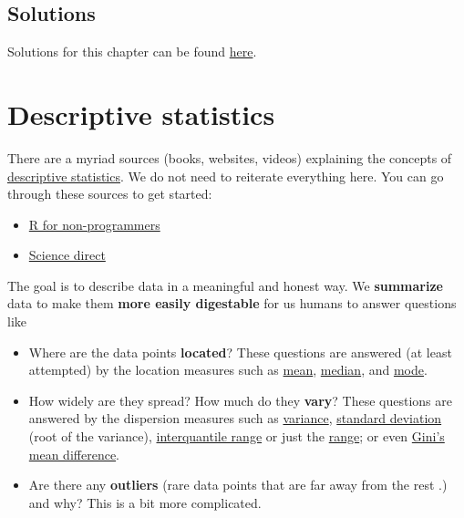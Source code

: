 \documentclass[
]{book}
\providecommand{\tightlist}{%
  \setlength{\itemsep}{0pt}\setlength{\parskip}{0pt}}
\begin{document}
\section{Solutions}\label{solutions}

Solutions for this chapter can be found \href{https://github.com/jdegenfellner/Script_QM1_ZHAW/tree/main/Solutions_to_Exercises/2_Probability}{here}.

\chapter{Descriptive statistics}\label{descriptive-statistics}

There are a myriad sources (books, websites, videos) explaining the concepts of \href{https://en.wikipedia.org/wiki/Descriptive_statistics}{descriptive statistics}.
We do not need to reiterate everything here. You can go through these sources to get started:

\begin{itemize}
\tightlist
\item
  \href{https://bookdown.org/daniel_dauber_io/r4np_book/descriptive-statistics.html}{R for non-programmers}
\item
  \href{https://www.sciencedirect.com/topics/social-sciences/descriptive-statistics}{Science direct}
\end{itemize}

The goal is to describe data in a meaningful and honest way.
We \textbf{summarize} data to make them \textbf{more easily digestable} for us humans to answer questions like

\begin{itemize}
\tightlist
\item
  Where are the data points \textbf{located}?
  These questions are answered (at least attempted) by the location measures such as
  \href{https://en.wikipedia.org/wiki/Mean}{mean}, \href{https://en.wikipedia.org/wiki/Median}{median}, and \href{https://en.wikipedia.org/wiki/Mode_(statistics)}{mode}.
\item
  How widely are they spread? How much do they \textbf{vary}?
  These questions are answered by the dispersion measures such as \href{https://en.wikipedia.org/wiki/Variance}{variance},
  \href{https://en.wikipedia.org/wiki/Standard_deviation}{standard deviation} (root of the variance),
  \href{https://en.wikipedia.org/wiki/Interquartile_range\#:~:text=The\%20IQR\%20of\%20a\%20set,a\%20median\%20calculated\%20as\%20follows.&text=The\%20second\%20quartile\%20Q2\%20is\%20the\%20same\%20as\%20the\%20ordinary\%20median.}{interquantile range}
  or just the \href{https://en.wikipedia.org/wiki/Range_(statistics)}{range}; or even \href{https://www.dss.uniroma1.it/RePec/mtn/articoli/2003-2-8.pdf}{Gini's mean difference}.
\item
  Are there any \textbf{outliers} (rare data points that are far away from the rest \citep[405]{westfall2020}.) and why?
  This is a bit more complicated.
\end{itemize}
\end{document}
